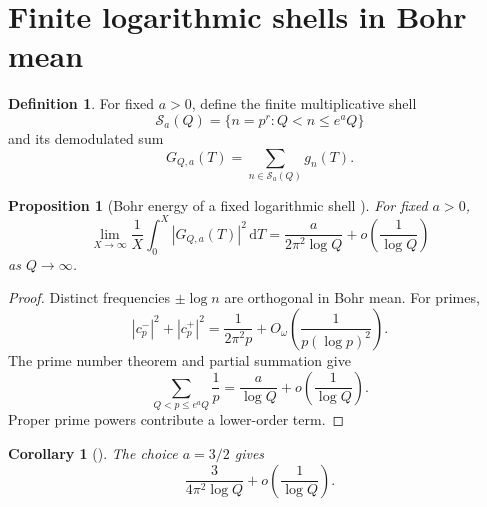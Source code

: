\documentclass[11pt]{amsart}
\numberwithin{equation}{section}
\theoremstyle{plain}
\newtheorem{proposition}[theorem]{Proposition}
\newtheorem{corollary}[theorem]{Corollary}
\theoremstyle{definition}
\newtheorem{definition}[theorem]{Definition}
\theoremstyle{remark}
\newcommand{\1}{\mathbf{1}}
\newcommand{\dd}{\,\mathrm{d}}
\begin{document}
\section{Finite logarithmic shells in Bohr mean}
\label{sec:shell_calculation}

\begin{definition}
\label{def:short_shell}
For fixed \(a>0\), define the finite multiplicative shell
\begin{equation}
\mathcal S_a(Q)
=
\{n=p^r:Q<n\leq e^aQ\}
\label{eq:short_shell}
\end{equation}
and its demodulated sum
\begin{equation}
G_{Q,a}(T)
=
\sum_{n\in\mathcal S_a(Q)}g_n(T).
\label{eq:shell_sum}
\end{equation}
\end{definition}


\begin{proposition}[Bohr energy of a fixed logarithmic shell {}]
\label{prop:shell_energy}
For fixed \(a>0\),
\begin{equation}
\lim_{X\to\infty}
\frac1X\int_0^X|G_{Q,a}(T)|^2\dd T
=
\frac{a}{2\pi^2\log Q}
+
o\left(\frac1{\log Q}\right)
\label{eq:shell_energy}
\end{equation}
as \(Q\to\infty\).
\end{proposition}

\begin{proof}
Distinct frequencies \(\pm\log n\) are orthogonal in Bohr mean.  For
primes,
\begin{equation}
|c_p^-|^2+|c_p^+|^2
=
\frac1{2\pi^2p}
+
O_\omega\left(\frac1{p(\log p)^2}\right).
\label{eq:ordinary_prime_energy}
\end{equation}
The prime number theorem and partial summation give \cite{Davenport2000,IwaniecKowalski2004}
\begin{equation}
\sum_{Q<p\leq e^aQ}\frac1p
=
\frac{a}{\log Q}
+
o\left(\frac1{\log Q}\right).
\label{eq:prime_shell_reciprocals}
\end{equation}
Proper prime powers contribute a lower-order term.
\end{proof}


\begin{corollary}[{}]
\label{cor:three_half_shell}
The choice \(a=3/2\) gives
\begin{equation}
\frac{3}{4\pi^2\log Q}
+
o\left(\frac1{\log Q}\right).
\label{eq:three_half_shell}
\end{equation}
\end{corollary}
\end{document}
